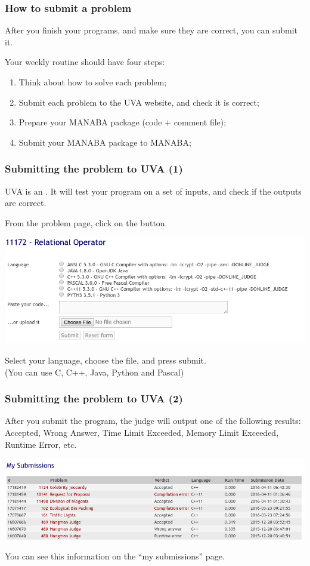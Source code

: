 \documentclass{beamer}
\begin{document}
\begin{frame}
  \frametitle{How to submit a problem} 
  
  After you finish your programs, \alert{and make sure they are
    correct}, you can submit it.

  \bigskip

  Your weekly routine should have four steps:
  \begin{enumerate}
    \item Think about how to solve each problem;
    \item Submit each problem to the UVA website, and check it is correct;
    \item Prepare your MANABA package (code + comment file);
    \item Submit your MANABA package to MANABA;
  \end{enumerate}
\end{frame}

\begin{frame}
  \frametitle{Submitting the problem to UVA (1)}

  {\small
  UVA is an . It will test your
  program on a set of inputs, and check if the outputs are correct.

  From the problem page, click on the  button. 
  
  \begin{center}
    \includegraphics[width=.8\textwidth]{../img/submitpage}
  \end{center}
  
  Select your language, choose the file, and press submit.\\
  (You can use C, C++, Java, Python {\tiny and Pascal})}
\end{frame}

\begin{frame}
  \frametitle{Submitting the problem to UVA (2)}

  {\small
    After you submit the program, the judge will output one of the
    following results: Accepted, Wrong Answer, Time Limit Exceeded,
    Memory Limit Exceeded, Runtime Error, etc.
    
    \begin{center}
      \includegraphics[width=.8\textwidth]{../img/submissionpage}
    \end{center}

    You can see this information on the ``my submissions'' page.
  }
\end{frame}
\end{document}
